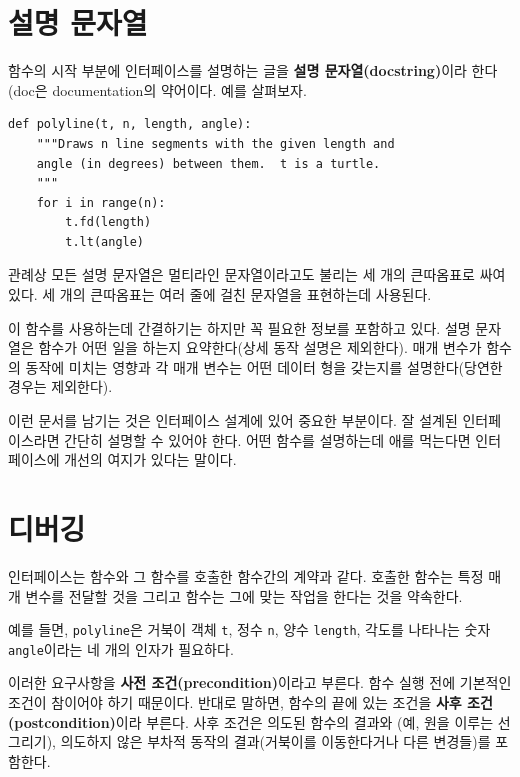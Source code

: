 \documentclass[10pt]{book}
\begin{document}
\section{설명 문자열}
\label{docstring}

함수의 시작 부분에 인터페이스를 설명하는 글을 {\bf 설명
  문자열(docstring)}이라 한다(doc은 documentation의 약어이다.  예를
살펴보자.

\begin{verbatim}
def polyline(t, n, length, angle):
    """Draws n line segments with the given length and
    angle (in degrees) between them.  t is a turtle.
    """    
    for i in range(n):
        t.fd(length)
        t.lt(angle)
\end{verbatim}
%
관례상 모든 설명 문자열은 멀티라인 문자열이라고도 불리는 세 개의
큰따옴표로 싸여있다.  세 개의 큰따옴표는 여러 줄에 걸친 문자열을
표현하는데 사용된다.

이 함수를 사용하는데 간결하기는 하지만 꼭 필요한 정보를 포함하고 있다.
설명 문자열은 함수가 어떤 일을 하는지 요약한다(상세 동작 설명은
제외한다).  매개 변수가 함수의 동작에 미치는 영향과 각 매개 변수는 어떤
데이터 형을 갖는지를 설명한다(당연한 경우는 제외한다).

이런 문서를 남기는 것은 인터페이스 설계에 있어 중요한 부분이다.  잘
설계된 인터페이스라면 간단히 설명할 수 있어야 한다.  어떤 함수를
설명하는데 애를 먹는다면 인터페이스에 개선의 여지가 있다는 말이다.


\section{디버깅}

인터페이스는 함수와 그 함수를 호출한 함수간의 계약과 같다.  호출한
함수는 특정 매개 변수를 전달할 것을 그리고 함수는 그에 맞는 작업을
한다는 것을 약속한다.

예를 들면, {\tt polyline}은 거북이 객체 {\tt t}, 정수 {\tt n}, 양수
{\tt length}, 각도를 나타나는 숫자 {\tt angle}이라는 네 개의 인자가
필요하다.

이러한 요구사항을 {\bf 사전 조건(precondition)}이라고 부른다.  함수
실행 전에 기본적인 조건이 참이어야 하기 때문이다.  반대로 말하면,
함수의 끝에 있는 조건을 {\bf 사후 조건(postcondition)}이라 부른다.
사후 조건은 의도된 함수의 결과와 (예, 원을 이루는 선 그리기), 의도하지
않은 부차적 동작의 결과(거북이를 이동한다거나 다른 변경들)를 포함한다.
\end{document}
